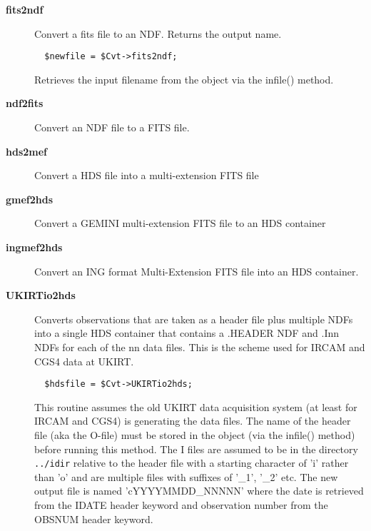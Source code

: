 \begin{description}

\item[\textbf{fits2ndf}] \mbox{}

Convert a fits file to an NDF.
Returns the output name.

\begin{verbatim}
  $newfile = $Cvt->fits2ndf;
\end{verbatim}


Retrieves the input filename from the object via the infile()
method.


\item[\textbf{ndf2fits}] \mbox{}

Convert an NDF file to a FITS file.


\item[\textbf{hds2mef}] \mbox{}

Convert a HDS file into a multi-extension FITS file


\item[\textbf{gmef2hds}] \mbox{}

Convert a GEMINI multi-extension FITS file to an HDS container


\item[\textbf{ingmef2hds}] \mbox{}

Convert an ING format Multi-Extension FITS file into an HDS container.


\item[\textbf{UKIRTio2hds}] \mbox{}

Converts observations that are taken as a header file plus multiple
NDFs into a single HDS container that contains a .HEADER NDF and
.Inn NDFs for each of the nn data files. This is the scheme used for
IRCAM and CGS4 data at UKIRT.

\begin{verbatim}
  $hdsfile = $Cvt->UKIRTio2hds;
\end{verbatim}


This routine assumes the old UKIRT data acquisition system (at least for
IRCAM and CGS4) is generating the data files. The name of the header
file (aka the O-file) must be stored in the object (via the infile()
method) before running this method. The I files are assumed to be in
the directory \texttt{../idir} relative to the header file with a starting
character of 'i' rather than 'o' and are multiple files with
suffixes of '\_1', '\_2' etc. The new output file
is named 'cYYYYMMDD\_NNNNN' where the date is retrieved from the IDATE header
keyword and observation number from the OBSNUM header keyword.




\end{description}

